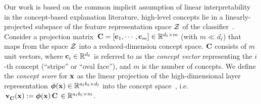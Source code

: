 
Our work is based on the common implicit assumption of linear interpretability in the concept-based explanation literature, \ie high-level concepts lie in a linearly-projected subspace of the feature representation space $\mathcal{Z}$ of the classifier~\citep{kim2018tcav}. 
Consider a projection matrix $\,\mathbf{C} = [\mathbf{c}_1, \cdots, \mathbf{c}_m] \in \mathbb{R}^{d_\ell \times m}$ (with $m \ll d_\ell$) that maps from the space $\mathcal{Z}$ into a reduced-dimension concept space. 
$\mathbf{C}$ consists of $m$ unit vectors, where $\mathbf{c}_i \in \mathbb{R}^{d_\ell}$ is referred to as the \textit{concept vector} representing the $i$-th concept (\eg ``stripe'' or ``oval face''), and $m$ is the number of concepts.
We define the \textit{concept score} for $\mathbf{x}$ as the linear projection of the high-dimensional layer representation $\bm{\phi}(\mathbf{x}) \in \mathbb{R}^{a_\ell b_\ell \times d_\ell}$ into the concept space~\citep{yeh2020completeness}, i.e. $\,\mathbf{v}^{}_{\mathbf{C}}(\mathbf{x}) := \bm{\phi}(\mathbf{x})\, \mathbf{C} \,\in \mathbb{R}^{a_\ell b_\ell \times m}$.
